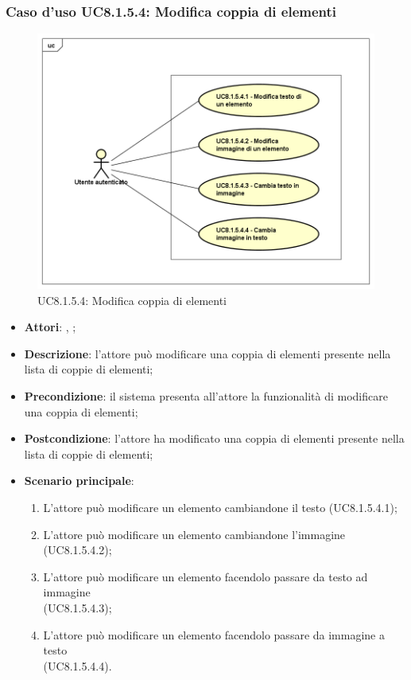 	\subsubsection{Caso d'uso UC8.1.5.4: Modifica coppia di elementi}
	\label{UC8.1.5.4}
	\begin{figure}[h]
		\centering
		\includegraphics[scale=0.5,keepaspectratio]{UML/UC8_1_5_4.png}
		\caption{UC8.1.5.4: Modifica coppia di elementi}
	\end{figure}
	\FloatBarrier
	\begin{itemize}
		\item \textbf{Attori}: \uau, \uaupro;
		\item \textbf{Descrizione}: l'attore può modificare una coppia di elementi presente nella lista di coppie di elementi;
		\item \textbf{Precondizione}: il sistema presenta all'attore la funzionalità di modificare una coppia di elementi;
		\item \textbf{Postcondizione}: l'attore ha modificato una coppia di elementi presente nella lista di coppie di elementi; 
		\item \textbf{Scenario principale}: 
		\begin{enumerate}
			\item L'attore può modificare un elemento cambiandone il testo (UC8.1.5.4.1);
			\item L'attore può modificare un elemento cambiandone l'immagine (UC8.1.5.4.2);
			\item L'attore può modificare un elemento facendolo passare da testo ad immagine \\(UC8.1.5.4.3);
			\item L'attore può modificare un elemento facendolo passare da immagine a testo \\(UC8.1.5.4.4).	
		\end{enumerate}
	\end{itemize}
	
